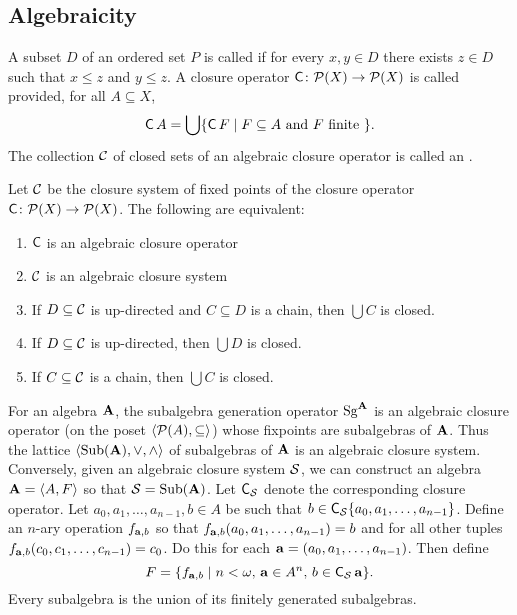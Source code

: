 \subsection{Algebraicity}
A subset $D$ of an ordered set $P$ is called 
if for every $x, y \in D$ there exists $z \in D$ such that
$x \leq z$ and $y \leq z$. 
A closure operator $\operatorname{\mathsf{C}}\colon \mathcal{P}(X) \to \mathcal{P}(X)$ is called  provided,
for all $A\subseteq X$, 
\[
\operatorname{\mathsf{C}} A = \bigcup \{\operatorname{\mathsf{C}} F \mid F \subseteq A \text{ and } F \text{ finite } \}.
\]
The collection $\mathcal{C}$ of closed sets of an algebraic closure operator is called an
.
\begin{theorem}
  Let $\mathcal{C}$ be the closure system of fixed points of the closure operator $\operatorname{\mathsf{C}}\colon \mathcal{P}(X) \to \mathcal{P}(X)$.
  The following are equivalent:
\begin{enumerate}
\item $\operatorname{\mathsf{C}}$ is an algebraic closure operator
\item $\mathcal{C}$ is an algebraic closure system
\item If $D\subseteq \mathcal{C}$ is up-directed and $C\subseteq D$ is a chain, then $\bigcup C$ is closed.
\item If $D\subseteq \mathcal{C}$ is up-directed, then $\bigcup D$ is closed.
\item If $C\subseteq \mathcal{C}$ is a chain, then $\bigcup C$ is closed.
\end{enumerate}
\end{theorem}

For an algebra $\mathbf{A}$, the subalgebra generation operator $\operatorname{Sg}^{\mathbf{A}}$ is an algebraic
closure operator (on the poset $\langle\mathcal{P}(A), \subseteq\rangle$) whose fixpoints are subalgebras of $\mathbf{A}$.
Thus the lattice $\langle\operatorname{Sub}(\mathbf{A}), \vee, \wedge\rangle$ of subalgebras of $\mathbf{A}$ is an algebraic closure
system.
Conversely, given an algebraic closure system $\mathcal{S}$, we can construct an algebra $\mathbf{A} =\langle A, F\rangle$ so that
$\mathcal{S} = \operatorname{Sub}(\mathbf{A})$.
Let $\operatorname{\mathsf{C}}_{\mathcal{S}}$ denote the corresponding closure operator.
Let $a_0, a_1, \dots, a_{n-1}, b \in A$ be such that
$b \in \operatorname{\mathsf{C}}_{\mathcal{S}} \{a_0, a_1, \dots, a_{n-1}\}$.  Define an $n$-ary operation
$f_{\mathbf{a}, b}$ so that $f_{\mathbf{a}, b}(a_0, a_1, \dots, a_{n-1}) = b$ and
for all other tuples $f_{\mathbf{a}, b}(c_0, c_1, \dots, c_{n-1}) = c_0$.
Do this for each $\mathbf{a} = (a_0, a_1, \dots, a_{n-1})$. Then define
\[
F = \{f_{\mathbf{a}, b} \mid  n< \omega, \, \mathbf{a} \in A^n,  \, b \in \operatorname{\mathsf{C}}_{\mathcal{S}} \mathbf{a}\}.
\]
Every subalgebra is the union of its finitely generated subalgebras.

